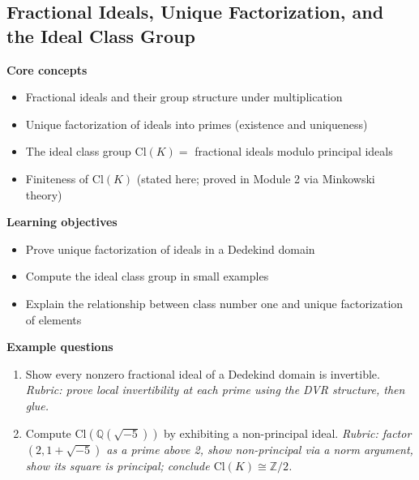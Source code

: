 \documentclass[11pt]{article}
\newcommand{\Q}{\mathbb{Q}}
\newcommand{\Z}{\mathbb{Z}}
\begin{document}
\subsection{Fractional Ideals, Unique Factorization, and the Ideal Class Group}
\textbf{Core concepts}
\begin{itemize}[noitemsep]
  \item Fractional ideals and their group structure under multiplication
  \item Unique factorization of ideals into primes (existence and uniqueness)
  \item The ideal class group $\mathrm{Cl}(K) = $ fractional ideals modulo principal ideals
  \item Finiteness of $\mathrm{Cl}(K)$ (stated here; proved in Module 2 via Minkowski theory)
\end{itemize}
\textbf{Learning objectives}
\begin{itemize}[noitemsep]
  \item Prove unique factorization of ideals in a Dedekind domain
  \item Compute the ideal class group in small examples
  \item Explain the relationship between class number one and unique factorization of elements
\end{itemize}
\textbf{Example questions}
\begin{enumerate}[noitemsep]
  \item[Q1 (foundational).] Show every nonzero fractional ideal of a Dedekind domain is invertible. \emph{Rubric: prove local invertibility at each prime using the DVR structure, then glue.}
  \item[Q2 (advanced).] Compute $\mathrm{Cl}(\Q(\sqrt{-5}))$ by exhibiting a non-principal ideal. \emph{Rubric: factor $(2,1+\sqrt{-5})$ as a prime above 2, show non-principal via a norm argument, show its square is principal; conclude $\mathrm{Cl}(K)\cong \Z/2$.}
\end{enumerate}

\end{document}
